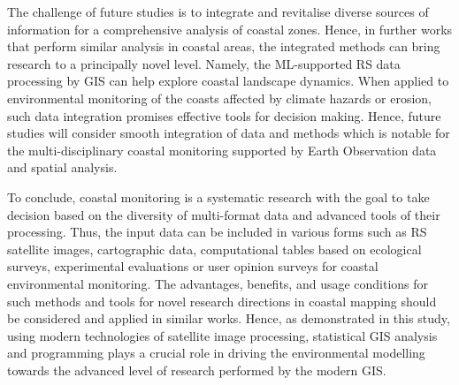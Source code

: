 \documentclass[jmse,article,submit,pdftex,moreauthors]{Definitions/mdpi}
\begin{document}
The challenge of future studies is to integrate and revitalise diverse sources of information for a comprehensive analysis of coastal zones. Hence, in further works that perform similar analysis in coastal areas, the integrated methods can bring research to a principally novel level. Namely, the ML-supported RS data processing by GIS can help explore coastal landscape dynamics. When applied to environmental monitoring of the coasts affected by climate hazards or erosion, such data integration promises effective tools for decision making. Hence, future studies will consider smooth integration of data and methods which is notable for the multi-disciplinary coastal monitoring supported by Earth Observation data and spatial analysis. 

To conclude, coastal monitoring is a systematic research with the goal to take decision based on the diversity of multi-format data and advanced tools of their processing. Thus, the input data can be included in various forms such as RS satellite images, cartographic data, computational tables based on ecological surveys, experimental evaluations or user opinion surveys for coastal environmental monitoring. The advantages, benefits, and usage conditions for such methods and tools for novel research directions in coastal mapping should be considered and applied in similar works. Hence, as demonstrated in this study, using modern technologies of satellite image processing, statistical GIS analysis and programming plays a crucial role in driving the environmental modelling towards the advanced level of research performed by the modern GIS. 






\end{document}

